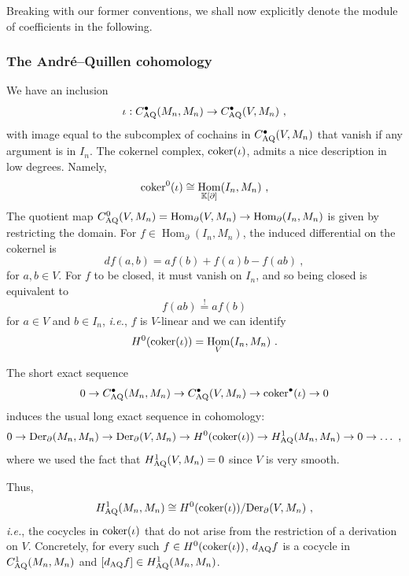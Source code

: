 \documentclass[11pt]{amsart}
\numberwithin{equation}{section}
\theoremstyle{definition}
\newcommand{\bb}{\mathbb}
\newcommand{\AQ}{{\textup{AQ}}}
\DeclareMathOperator{\Hom}{Hom}
\newcommand{\ik}{{\bb K}}
\newcommand{\coker}{{\textup{coker}}}
\newcommand{\Der}{{\textup{Der}}}
\newcommand{\0}{{\textbf{0}}}
\def \ie{{\it i.e.}}
\begin{document}
Breaking with our former conventions, we shall now explicitly denote the module of coefficients in the following.


\subsubsection{The Andr\'e--Quillen cohomology}

We have an inclusion
\[
\iota: C_{\AQ}^\bullet(M_n,M_n) \rightarrow C^\bullet_{\AQ}(V,M_n)~,
\]
with image equal to the subcomplex of cochains in $C_{\AQ}^\bullet(V,M_n)$ that vanish if any argument is in $I_n$. The cokernel complex, $\coker(\iota)$, admits a nice description in low degrees. Namely,
\[
\coker^0(\iota) \cong \Hom_{\ik[\partial]}(I_n,M_n)~,
\]
The quotient map $C^0_{\AQ}(V,M_n)=\Hom_\partial(V,M_n) \rightarrow \Hom_{\partial}(I_n,M_n)$ is given by restricting the domain. For $f\in \Hom_{\partial}(I_n,M_n)$, the induced differential on the cokernel is 
\[
df(a,b) = af(b) + f(a)b - f(ab)~,
\]
for $a,b\in V$. For $f$ to be closed, it must vanish on $I_n$, and so being closed is equivalent to
\[
f(ab) \overset{!}{=} af(b)
\]
for $a\in V$ and $b\in I_n$, \ie, $f$ is $V$-linear and we can identify
\begin{equation}\label{eq:cocycle in Harrison cokernel}
H^0(\coker(\iota)) = \Hom_V(I_n, M_n)~.
\end{equation}

The short exact sequence
\[
0 \rightarrow C_{\AQ}^\bullet(M_n,M_n)\rightarrow C_{\AQ}^\bullet(V, M_n)\rightarrow  \coker^\bullet(\iota)\rightarrow 0
\]
induces the usual long exact sequence in cohomology:
\[
0 \rightarrow  \Der_\partial(M_n,M_n) \rightarrow  \Der_\partial(V,M_n) \rightarrow  H^0(\coker(\iota)) \rightarrow  H^1_{\AQ}(M_n,M_n)\rightarrow 0 \rightarrow  \dots~,
\]
where we used the fact that $H^1_{\AQ}(V,M_n)=0$ since $V$ is very smooth.

Thus, 
\begin{equation}\label{eq:identifying Harrison of quotient}
H^1_{\AQ}(M_n,M_n) \cong H^0(\coker(\iota)) / \Der_\partial(V,M_n)~,
\end{equation}
\ie, the cocycles in $\coker(\iota)$ that do not arise from the restriction of a derivation on $V$. Concretely, for every such $f\in H^0(\coker(\iota))$, $d_{\AQ}f$ is a cocycle in $C^1_{\AQ}(M_n,M_n)$ and $[d_{\AQ} f]\in H^1_{\AQ}(M_n,M_n)$.
\end{document}
